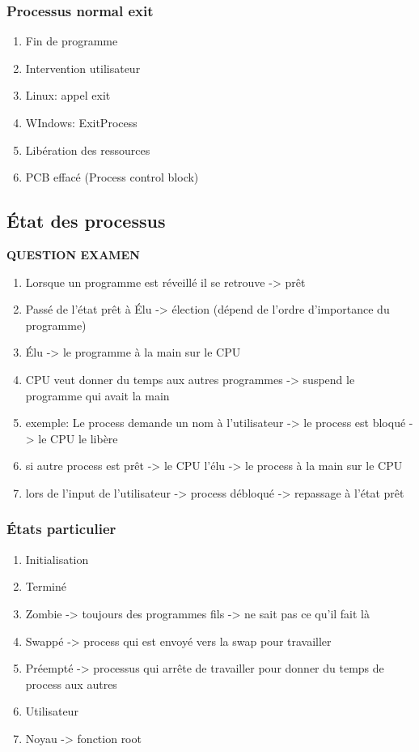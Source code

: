 \subsubsection{Processus normal exit}
\begin{enumerate}
  \item Fin de programme
  \item Intervention utilisateur
  \item Linux: appel exit
  \item WIndows: ExitProcess
  \item Libération des ressources
  \item PCB effacé (Process control block)
\end{enumerate}

\subsection{État des processus}
\textbf{QUESTION EXAMEN}
\begin{enumerate}
\item Lorsque un programme est réveillé il se retrouve -> prêt
\item Passé de l'état prêt à Élu -> élection (dépend de l'ordre d'importance du programme)
\item Élu -> le programme à la main sur le CPU
\item CPU veut donner du temps aux autres programmes -> suspend le programme qui avait la main
\item exemple: Le process demande un nom à l'utilisateur -> le process est bloqué -> le CPU le libère
\item si autre process est prêt -> le CPU l'élu -> le process à la main sur le CPU 
\item lors de l'input de l'utilisateur -> process débloqué -> repassage à l'état prêt
\end{enumerate}

\subsubsection{États particulier}
\begin{enumerate}
\item Initialisation
\item Terminé
\item Zombie -> toujours des programmes fils -> ne sait pas ce qu'il fait là
\item Swappé -> process qui est envoyé vers la swap pour travailler
\item Préempté -> processus qui arrête de travailler pour donner du temps de process aux autres
\item Utilisateur
\item Noyau -> fonction root
\end{enumerate}

